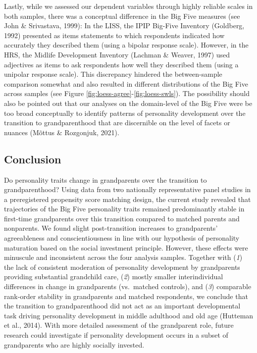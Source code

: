 \documentclass[
  english,
  man, noextraspace]{apa7}
\begin{document}
Lastly, while we assessed our dependent variables through highly reliable scales in both samples, there was a conceptual difference in the Big Five measures (see John \& Srivastava, 1999): In the LISS, the IPIP Big-Five Inventory (Goldberg, 1992) presented as items statements to which respondents indicated how accurately they described them (using a bipolar response scale). However, in the HRS, the Midlife Development Inventory (Lachman \& Weaver, 1997) used adjectives as items to ask respondents how well they described them (using a unipolar response scale). This discrepancy hindered the between-sample comparison somewhat and also resulted in different distributions of the Big Five across samples (see Figure \ref{fig:loess-agree}-\ref{fig:loess-swls}). The possibility should also be pointed out that our analyses on the domain-level of the Big Five were be too broad conceptually to identify patterns of personality development over the transition to grandparenthood that are discernible on the level of facets or nuances (Mõttus \& Rozgonjuk, 2021).

\hypertarget{conclusion}{%
\subsection{Conclusion}\label{conclusion}}

Do personality traits change in grandparents over the transition to grandparenthood? Using data from two nationally representative panel studies in a preregistered propensity score matching design, the current study revealed that trajectories of the Big Five personality traits remained predominantly stable in first-time grandparents over this transition compared to matched parents and nonparents. We found slight post-transition increases to grandparents' agreeableness and conscientiousness in line with our hypothesis of personality maturation based on the social investment principle. However, these effects were minuscule and inconsistent across the four analysis samples. Together with (\emph{1}) the lack of consistent moderation of personality development by grandparents providing substantial grandchild care, (\emph{2}) mostly smaller interindividual differences in change in grandparents (vs.~matched controls), and (\emph{3}) comparable rank-order stability in grandparents and matched respondents, we conclude that the transition to grandparenthood did not act as an important developmental task driving personality development in middle adulthood and old age (Hutteman et al., 2014). With more detailed assessment of the grandparent role, future research could investigate if personality development occurs in a subset of grandparents who are highly socially invested.
\end{document}
